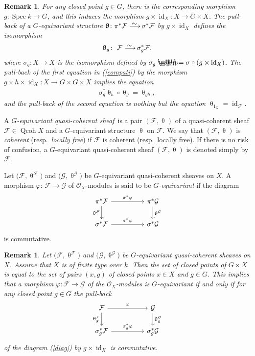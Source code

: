 \documentclass[pdftex]{sigma}%
\makeatletter
\newtheorem{rem}[dfn]{Remark}
\newcommand*{\defeq}{\mathrel{\rlap{%
 \raisebox{0.3ex}{$\m@th\cdot$}}%
 \raisebox{-0.3ex}{$\m@th\cdot$}}%
 =}
\numberwithin{equation}{section}
\newcommand{\Spec}{\operatorname{Spec}}
\newcommand{\Qcoh}{\operatorname{Qcoh}}
\newcommand{\id}{\operatorname{id}}
\newcommand{\cF}{\mathcal{F}}
\newcommand{\cG}{\mathcal{G}}
\newcommand{\cO}{\mathcal{O}}
\newcommand{\simto}{\,\,\,\,\raisebox{4pt}{$\sim$}{\kern -1.1em \longrightarrow}\,}
\makeatother
\begin{document}
\begin{rem}\label{closed point isom}
For any closed point $g\in G$, there is the corresponding morphism $g\colon \Spec k\to G$, and this induces the morphism $g\times\id_X\colon X\to G\times X$. The pull-back of a $G$-equivariant structure $\uptheta\colon \pi^*\cF\simto \sigma^*\cF$ by $g\times \id_X$ defines the isomorphism
\begin{gather*}
\uptheta_g\colon\ \cF\simto \sigma_g^*\cF,
\end{gather*}
where $\sigma_g\colon X\to X$ is the isomorphism defined by $\sigma_g\defeq \sigma\circ (g\times \id_X)$. The pull-back of the first equation in (\ref{compati}) by the morphism $ g\times h\times\id_X\colon X\to G\times G\times X$ implies the equation
\begin{gather*}
\sigma_g^*\uptheta_h\circ \uptheta_g=\uptheta_{gh},
\end{gather*}
and the pull-back of the second equation is nothing but the equation $\uptheta_{1_G}=\id_{\cF}$.
\end{rem}

A {\it $G$-equivariant quasi-coherent sheaf} \,is a pair $(\cF, \uptheta)$ of a quasi-coherent sheaf $\cF\in\Qcoh X$ and a $G$-equivariant structure $\uptheta$ on $\cF$. We say that $(\cF,\uptheta)$ is {\it coherent} (resp.\ {\it locally free}) if $\cF$ is coherent (resp.\ locally free). If there is no risk of confusion, a $G$-equivariant quasi-coherent sheaf $(\cF, \uptheta)$ is denoted simply by $\cF$.

Let $\big(\cF,\uptheta^{\cF}\big)$ and $\big(\cG,\uptheta^{\cG}\big)$ be $G$-equivariant quasi-coherent sheaves on $X$. A morphism $\varphi$: $\cF\to \cG$ of $\cO_X$-modules is said to be {\it $G$-equivariant} if the diagram
\begin{equation}\label{diag}
\begin{tikzcd}
\pi^*\cF\arrow[rr,"\pi^*\varphi"]\arrow[d,"\uptheta^{\cF}"']&&\pi^*\cG\arrow[d," \uptheta^{\cG}"]\\
\sigma^*\cF\arrow[rr, "\sigma^*\varphi"]&&\sigma^*\cG
\end{tikzcd}\end{equation}
is commutative.

\begin{rem}\label{cl pt}
Let $\big(\cF,\uptheta^{\cF}\big)$ and $\big(\cG,\uptheta^{\cG}\big)$ be $G$-equivariant quasi-coherent sheaves on $X$. Assume that $X$ is of finite type over $k$. Then the set of closed points of $G\times X$ is equal to the set of pairs $(x,g)$ of closed points $x\in X$ and $g\in G$. This implies that a morphism $\varphi\colon\cF\to \cG$ of the $\cO_X$-modules is $G$-equivariant if and only if for any closed point $g\in G$ the pull-back
\begin{equation*}
\begin{tikzcd}
\cF\arrow[rr,"\varphi"]\arrow[d,"\uptheta^{\cF}_g"']&&\cG\arrow[d," \uptheta^{\cG}_g"]\\
\sigma_g^*\cF\arrow[rr, "\sigma^*_g\varphi"]&&\sigma_g^*\cG
\end{tikzcd}
\end{equation*}
of the diagram (\ref{diag}) by $g\times\id_X $ is commutative.
\end{rem}
\end{document}
